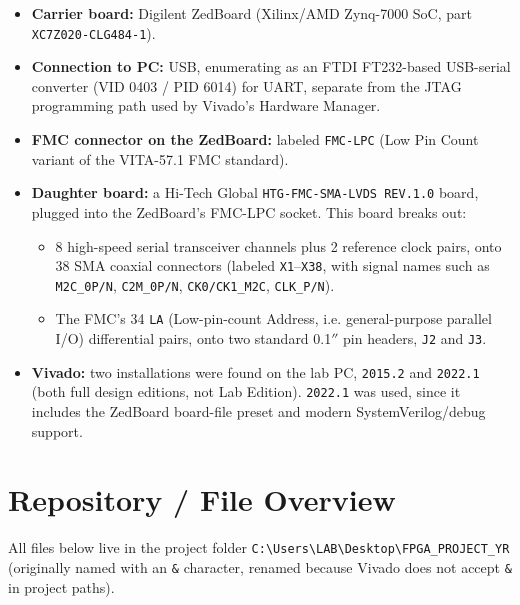 \documentclass[11pt]{article}
\begin{document}
\begin{itemize}
    \item \textbf{Carrier board:} Digilent ZedBoard (Xilinx/AMD Zynq-7000 SoC,
    part \texttt{XC7Z020-CLG484-1}).
    \item \textbf{Connection to PC:} USB, enumerating as an FTDI FT232-based USB-serial
    converter (VID 0403 / PID 6014) for UART, separate from the JTAG programming path used
    by Vivado's Hardware Manager.
    \item \textbf{FMC connector on the ZedBoard:} labeled \texttt{FMC-LPC} (Low Pin Count
    variant of the VITA-57.1 FMC standard).
    \item \textbf{Daughter board:} a Hi-Tech Global \texttt{HTG-FMC-SMA-LVDS REV.1.0} board,
    plugged into the ZedBoard's FMC-LPC socket. This board breaks out:
    \begin{itemize}
        \item 8 high-speed serial transceiver channels plus 2 reference clock pairs, onto
        38 SMA coaxial connectors (labeled \texttt{X1}--\texttt{X38}, with signal names
        such as \texttt{M2C\_0P/N}, \texttt{C2M\_0P/N}, \texttt{CK0/CK1\_M2C}, \texttt{CLK\_P/N}).
        \item The FMC's 34 \texttt{LA} (Low-pin-count Address, i.e. general-purpose parallel
        I/O) differential pairs, onto two standard 0.1$''$ pin headers, \texttt{J2} and
        \texttt{J3}.
    \end{itemize}
    \item \textbf{Vivado:} two installations were found on the lab PC, \texttt{2015.2} and
    \texttt{2022.1} (both full design editions, not Lab Edition). \texttt{2022.1} was used,
    since it includes the ZedBoard board-file preset and modern SystemVerilog/debug support.
\end{itemize}

\section{Repository / File Overview}

All files below live in the project folder
\texttt{C:\textbackslash Users\textbackslash LAB\textbackslash Desktop\textbackslash FPGA\_PROJECT\_YR}
(originally named with an \texttt{\&} character, renamed because Vivado does not accept
\texttt{\&} in project paths).
\end{document}
